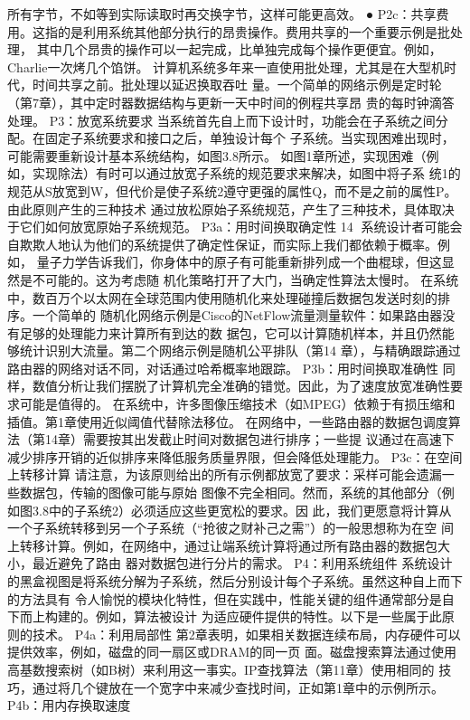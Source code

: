 所有字节，不如等到实际读取时再交换字节，这样可能更高效。
 ● P2c：共享费用。这指的是利用系统其他部分执行的昂贵操作。费用共享的一个重要示例是批处理，
   其中几个昂贵的操作可以一起完成，比单独完成每个操作更便宜。例如，Charlie一次烤几个馅饼。
   计算机系统多年来一直使用批处理，尤其是在大型机时代，时间共享之前。批处理以延迟换取吞吐
   量。一个简单的网络示例是定时轮（第7章），其中定时器数据结构与更新一天中时间的例程共享昂
   贵的每时钟滴答处理。
P3：放宽系统要求
当系统首先自上而下设计时，功能会在子系统之间分配。在固定子系统要求和接口之后，单独设计每个
子系统。当实现困难出现时，可能需要重新设计基本系统结构，如图3.8所示。
如图1章所述，实现困难（例如，实现除法）有时可以通过放宽子系统的规范要求来解决，如图中将子系
统1的规范从S放宽到W，但代价是使子系统2遵守更强的属性Q，而不是之前的属性P。
由此原则产生的三种技术
通过放松原始子系统规范，产生了三种技术，具体取决于它们如何放宽原始子系统规范。
P3a：用时间换取确定性
                                                    14
系统设计者可能会自欺欺人地认为他们的系统提供了确定性保证，而实际上我们都依赖于概率。例如，
量子力学告诉我们，你身体中的原子有可能重新排列成一个曲棍球，但这显然是不可能的。这为考虑随
机化策略打开了大门，当确定性算法太慢时。
在系统中，数百万个以太网在全球范围内使用随机化来处理碰撞后数据包发送时刻的排序。一个简单的
随机化网络示例是Cisco的NetFlow流量测量软件：如果路由器没有足够的处理能力来计算所有到达的数
据包，它可以计算随机样本，并且仍然能够统计识别大流量。第二个网络示例是随机公平排队（第14
章），与精确跟踪通过路由器的网络对话不同，对话通过哈希概率地跟踪。
P3b：用时间换取准确性
同样，数值分析让我们摆脱了计算机完全准确的错觉。因此，为了速度放宽准确性要求可能是值得的。
在系统中，许多图像压缩技术（如MPEG）依赖于有损压缩和插值。第1章使用近似阈值代替除法移位。
在网络中，一些路由器的数据包调度算法（第14章）需要按其出发截止时间对数据包进行排序；一些提
议通过在高速下减少排序开销的近似排序来降低服务质量界限，但会降低处理能力。
P3c：在空间上转移计算
请注意，为该原则给出的所有示例都放宽了要求：采样可能会遗漏一些数据包，传输的图像可能与原始
图像不完全相同。然而，系统的其他部分（例如图3.8中的子系统2）必须适应这些更宽松的要求。因
此，我们更愿意将计算从一个子系统转移到另一个子系统（“抢彼之财补己之需”）的一般思想称为在空
间上转移计算。例如，在网络中，通过让端系统计算将通过所有路由器的数据包大小，最近避免了路由
器对数据包进行分片的需求。
P4：利用系统组件
系统设计的黑盒视图是将系统分解为子系统，然后分别设计每个子系统。虽然这种自上而下的方法具有
令人愉悦的模块化特性，但在实践中，性能关键的组件通常部分是自下而上构建的。例如，算法被设计
为适应硬件提供的特性。以下是一些属于此原则的技术。
P4a：利用局部性
第2章表明，如果相关数据连续布局，内存硬件可以提供效率，例如，磁盘的同一扇区或DRAM的同一页
面。磁盘搜索算法通过使用高基数搜索树（如B树）来利用这一事实。IP查找算法（第11章）使用相同的
技巧，通过将几个键放在一个宽字中来减少查找时间，正如第1章中的示例所示。
P4b：用内存换取速度


